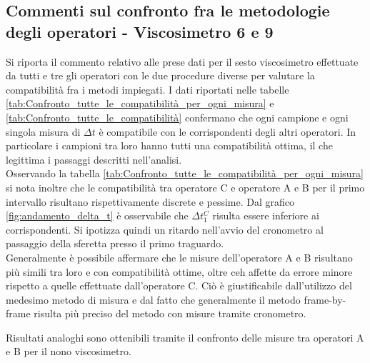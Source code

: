 \documentclass[a4paper,11pt,oneside]{article}
\begin{document}


\subsection*{Commenti sul confronto fra  le metodologie degli operatori - Viscosimetro 6 e 9}
Si riporta il commento relativo alle prese dati per il sesto viscosimetro effettuate da tutti e tre gli operatori con le due procedure diverse per valutare la compatibilità fra i metodi impiegati.
I dati riportati nelle tabelle \ref{tab:Confronto_tutte_le_compatibilità_per_ogni_misura} e  \ref{tab:Confronto_tutte_le_compatibilità} confermano che ogni campione e ogni singola misura di $\Delta t$ è compatibile con le corrispondenti degli altri operatori. In particolare i campioni tra loro hanno tutti una compatibilità ottima, il che legittima i passaggi descritti nell'analisi.\\
Osservando la tabella \ref{tab:Confronto_tutte_le_compatibilità_per_ogni_misura} si nota inoltre che le compatibilità tra operatore C e operatore A e B per il primo intervallo risultano rispettivamente discrete e pessime. Dal grafico \ref{fig:andamento_delta_t} è osservabile che $\Delta t^C_1$ risulta essere inferiore ai corrispondenti. Si ipotizza quindi un ritardo nell'avvio del cronometro al passaggio della sferetta presso il primo traguardo.\\
Generalmente è possibile affermare che le misure dell'operatore A e B risultano più simili tra loro e con compatibilità ottime, oltre ceh affette da errore minore rispetto a quelle effettuate dall'operatore C. Ciò è giustificabile dall'utilizzo del medesimo metodo di misura e dal fatto che generalmente il metodo frame-by-frame risulta più preciso del metodo con misure tramite cronometro.

Risultati analoghi sono ottenibili tramite il confronto delle misure tra operatori A e B per il nono viscosimetro.
\end{document}
